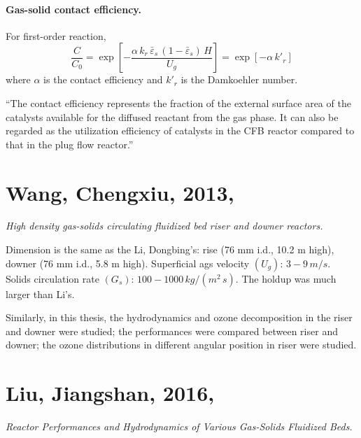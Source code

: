 \paragraph{Gas-solid contact efficiency. }
For first-order reaction,
\begin{equation}
    \frac{C}{C_0} 
    = \exp\left[ 
        -\frac{\alpha\,k_r\,\bar{\varepsilon}_s\, (1-\bar{\varepsilon}_s)\,H}{U_g} 
        \right]
    = \exp\left[ -\alpha\,k'_r \right]
\end{equation}
where $\alpha$ is the contact efficiency and $k'_r$ is the Damkoehler number.

``The contact efficiency represents the fraction of the external surface area of the catalysts available for the diffused reactant from the gas phase. 
It can also be regarded as the utilization efficiency of catalysts in the CFB reactor compared to that in the plug flow reactor.''



%
%
\section[Wang, Chengxiu, 2013]{Wang, Chengxiu, 2013, \citep{wangcx2013}}
\textit{High density gas-solids circulating fluidized bed riser and downer reactors.}

Dimension is the same as the Li, Dongbing's: rise (76 mm i.d., 10.2 m high), downer (76 mm i.d., 5.8 m high). 
Superficial ags velocity $(U_g)$: $3-9\,\si{m/s}$. 
Solids circulation rate $(G_s)$: $100-1000\,\si{kg/(m^2\,s)}$. 
The holdup was much larger than Li's.

Similarly, in this thesis, the hydrodynamics and ozone decomposition in the riser and downer were studied;
the performances were compared between riser and downer; 
the ozone distributions in different angular position in riser were studied.

%
%
\section[Liu, Jiangshan, 2016]{Liu, Jiangshan, 2016, \citep{liujs2016}}
\textit{Reactor Performances and Hydrodynamics of Various Gas-Solids Fluidized Beds.}